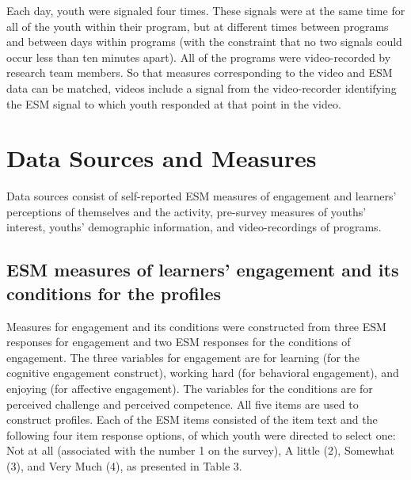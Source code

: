 \documentclass[]{msu-thesis}
\theoremstyle{definition}
\theoremstyle{definition}
\theoremstyle{definition}
\theoremstyle{remark}
\begin{document}
Each day, youth were signaled four times. These signals were at the same
time for all of the youth within their program, but at different times
between programs and between days within programs (with the constraint
that no two signals could occur less than ten minutes apart). All of the
programs were video-recorded by research team members. So that measures
corresponding to the video and ESM data can be matched, videos include a
signal from the video-recorder identifying the ESM signal to which youth
responded at that point in the video.

\section{Data Sources and Measures}\label{data-sources-and-measures}

Data sources consist of self-reported ESM measures of engagement and
learners' perceptions of themselves and the activity, pre-survey
measures of youths' interest, youths' demographic information, and
video-recordings of programs.

\subsection{ESM measures of learners' engagement and its conditions for
the
profiles}\label{esm-measures-of-learners-engagement-and-its-conditions-for-the-profiles}

Measures for engagement and its conditions were constructed from three
ESM responses for engagement and two ESM responses for the conditions of
engagement. The three variables for engagement are for learning (for the
cognitive engagement construct), working hard (for behavioral
engagement), and enjoying (for affective engagement). The variables for
the conditions are for perceived challenge and perceived competence. All
five items are used to construct profiles. Each of the ESM items
consisted of the item text and the following four item response options,
of which youth were directed to select one: Not at all (associated with
the number 1 on the survey), A little (2), Somewhat (3), and Very Much
(4), as presented in Table 3.

\begin{table}

\caption{\label{tab:unnamed-chunk-4}ESM measures for profiles}
\centering
{}
\end{table}
\end{document}

